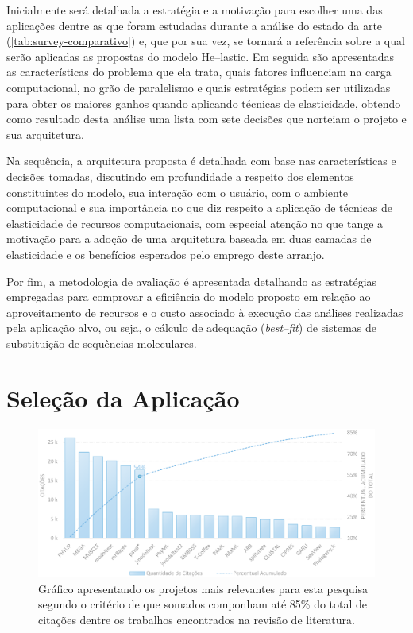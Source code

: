 \documentclass[english,brazilian]{UNISINOSmonografia} %
\newcommand\defaultFigureWidth{0.9}
\begin{document}
Inicialmente será detalhada a estratégia e a motivação para escolher uma das aplicações dentre as que foram estudadas durante a análise do estado da arte (\autoref{tab:survey-comparativo}) e, que por sua vez, se tornará a referência sobre a qual serão aplicadas as propostas do modelo \textsf{He}--lastic.
Em seguida são apresentadas as características do problema que ela trata, quais fatores influenciam na carga computacional, no grão de paralelismo e quais estratégias podem ser utilizadas para obter os maiores ganhos quando aplicando técnicas de elasticidade, obtendo como resultado desta análise uma lista com sete decisões que norteiam o projeto e sua arquitetura.


Na sequência, a arquitetura proposta é detalhada com base nas características e decisões tomadas, discutindo em profundidade a respeito dos elementos constituintes do modelo, sua interação com o usuário, com o ambiente computacional e sua importância no que diz respeito a aplicação de técnicas de elasticidade de recursos computacionais, com especial atenção no que tange a motivação para a adoção de uma arquitetura baseada em duas camadas de elasticidade e os benefícios esperados pelo emprego deste arranjo.




Por fim, a metodologia de avaliação é apresentada detalhando as estratégias empregadas para comprovar a eficiência do modelo proposto em relação ao aproveitamento de recursos e o custo associado à execução das análises realizadas pela aplicação alvo, ou seja, o cálculo de adequação (\textit{best--fit}) de sistemas de substituição de sequências moleculares.




\section{Seleção da Aplicação} %
\label{sec:modelo-selecao}


\begin{figure}[tb]
	\centering%
	\begin{minipage}{\defaultFigureWidth\textwidth}
		\caption{Gráfico apresentando os projetos mais relevantes para esta pesquisa segundo o critério de que somados componham até 85\% do total de citações dentre os trabalhos encontrados na revisão de literatura.}
		\label{fig:survey-topcitations}
		\vspace{1ex}
		\includegraphics[width=\textwidth]{survey-topcitations}
	\end{minipage}
\end{figure}
\end{document}
